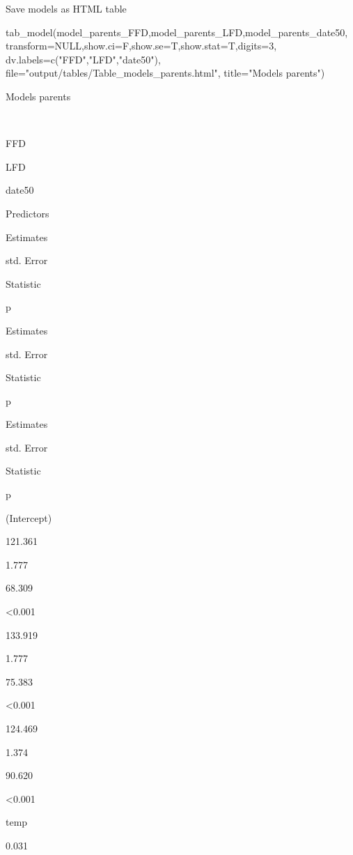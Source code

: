 \documentclass[
]{article}
\newenvironment{Shaded}{\begin{snugshade}}{\end{snugshade}}
\newcommand{\AttributeTok}[1]{\textcolor[rgb]{0.77,0.63,0.00}{#1}}
\newcommand{\ConstantTok}[1]{\textcolor[rgb]{0.00,0.00,0.00}{#1}}
\newcommand{\DecValTok}[1]{\textcolor[rgb]{0.00,0.00,0.81}{#1}}
\newcommand{\FunctionTok}[1]{\textcolor[rgb]{0.00,0.00,0.00}{#1}}
\newcommand{\NormalTok}[1]{#1}
\newcommand{\StringTok}[1]{\textcolor[rgb]{0.31,0.60,0.02}{#1}}
\begin{document}
Save models as HTML table

\begin{Shaded}
\begin{Highlighting}[]
\FunctionTok{tab\_model}\NormalTok{(model\_parents\_FFD,model\_parents\_LFD,model\_parents\_date50,}
          \AttributeTok{transform=}\ConstantTok{NULL}\NormalTok{,}\AttributeTok{show.ci=}\NormalTok{F,}\AttributeTok{show.se=}\NormalTok{T,}\AttributeTok{show.stat=}\NormalTok{T,}\AttributeTok{digits=}\DecValTok{3}\NormalTok{,}
          \AttributeTok{dv.labels=}\FunctionTok{c}\NormalTok{(}\StringTok{"FFD"}\NormalTok{,}\StringTok{"LFD"}\NormalTok{,}\StringTok{"date50"}\NormalTok{),}
          \AttributeTok{file=}\StringTok{"output/tables/Table\_models\_parents.html"}\NormalTok{,}
          \AttributeTok{title=}\StringTok{"Models parents"}\NormalTok{)}
\end{Highlighting}
\end{Shaded}

Models parents

~

FFD

LFD

date50

Predictors

Estimates

std. Error

Statistic

p

Estimates

std. Error

Statistic

p

Estimates

std. Error

Statistic

p

(Intercept)

121.361

1.777

68.309

\textless0.001

133.919

1.777

75.383

\textless0.001

124.469

1.374

90.620

\textless0.001

temp

0.031
\end{document}
